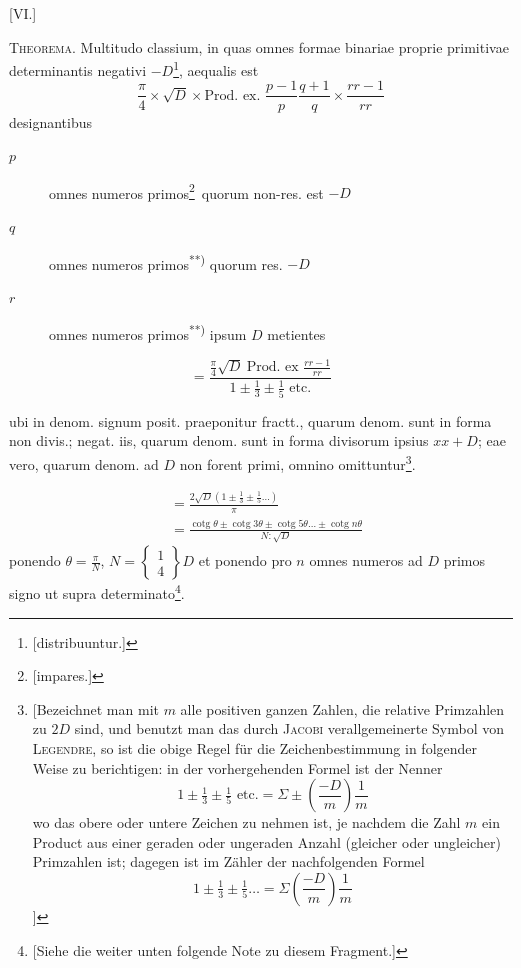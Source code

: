 \par\bigskip{}\centerline{[VI.]}\medskip
\textsc{Theorema.} Multitudo classium, in quas omnes formae binariae proprie primitivae determinantis negativi $-D$\begingroup\renewcommand{\thefootnote}{*)}\footnote{[distribuuntur.]}\endgroup, aequalis est
\[
\frac\pi4\times\surd D\times\text{Prod. ex. }\frac{p-1}p\frac{q+1}q\times\frac{rr-1}{rr}
\]
designantibus
\begin{description}
\item[$p$] omnes numeros primos\begingroup\renewcommand{\thefootnote}{**)}\footnote{[impares.]}\endgroup\ quorum non-res. est $-D$
\item[$q$] omnes numeros primos\textsuperscript{**)} quorum res. $-D$
\item[$r$] omnes numeros primos\textsuperscript{**)} ipsum $D$ metientes
\end{description}
\[
=\frac{\frac\pi4\surd D\ \text{Prod. ex }\frac{rr-1}{rr}}{1\pm\tfrac13\pm\tfrac15\text{ etc.}}
\]

ubi in denom. signum posit. praeponitur fractt., quarum denom. sunt in forma non divis.; negat. iis, quarum denom. sunt in forma divisorum ipsius $xx+D$; eae vero, quarum denom. ad $D$ non forent primi, omnino omittuntur\begingroup\renewcommand{\thefootnote}{***)}\footnote{[Bezeichnet man mit $m$ alle positiven ganzen Zahlen, die relative Primzahlen zu $2D$ sind, und benutzt man das durch \textsc{Jacobi} verallgemeinerte Symbol von \textsc{Legendre}, so ist die obige Regel für die Zeichenbestimmung in folgender Weise zu berichtigen: in der vorhergehenden Formel ist der Nenner
\[
1\pm\tfrac13\pm\tfrac15\text{ etc.}=\Sigma\pm\left(\frac{-D}m\right)\frac1m
\]
wo das obere oder untere Zeichen zu nehmen ist, je nachdem die Zahl $m$ ein Product aus einer geraden oder ungeraden Anzahl (gleicher oder ungleicher) Primzahlen ist; dagegen ist im Zähler der nachfolgenden Formel
\[
1\pm\tfrac13\pm\tfrac15\ldots=\Sigma\left(\frac{-D}m\right)\frac1m
\]
]}\endgroup.

\[
\begin{aligned}
&=\frac{2\surd D(1\pm\tfrac13\pm\tfrac15\ldots)}\pi\\
&=\frac{\operatorname{cotg}\theta\pm\operatorname{cotg}3\theta\pm\operatorname{cotg}5\theta\ldots\pm\operatorname{cotg}n\theta}{N:\surd D}
\end{aligned}
\]
ponendo $\theta=\frac\pi N$, $N=\left\{\begin{smallmatrix}1\\4\end{smallmatrix}\right\}D$ et ponendo pro $n$ omnes numeros ad $D$ primos signo ut supra determinato\begingroup\renewcommand{\thefootnote}{*)}\footnote{[Siehe die weiter unten folgende Note zu diesem Fragment.]}\endgroup.

